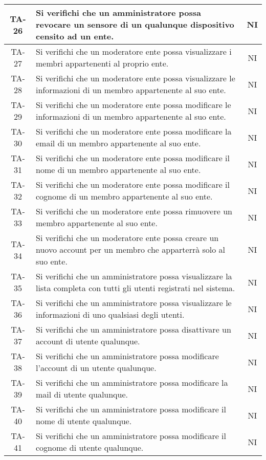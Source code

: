 \begin{center}
\begin{longtable}{|c|p{10cm}|c|}
			 \hline
			 TA-26 & Si verifichi che un amministratore possa revocare un sensore di un qualunque dispositivo censito ad un ente. & NI \\
			 \hline
			 TA-27 &  Si verifichi che un moderatore ente possa visualizzare i membri appartenenti al proprio ente. & NI \\
			 \hline
			 TA-28 & Si verifichi che un moderatore ente possa visualizzare le informazioni di un membro appartenente al suo ente. & NI \\
			 \hline
			 TA-29 & Si verifichi che un moderatore ente possa modificare le informazioni di un membro appartenente al suo ente. & NI \\
			 \hline
			 TA-30 & Si verifichi che un moderatore ente possa modificare la email di un membro appartenente al suo ente. & NI \\
			 \hline
			 TA-31 & Si verifichi che un moderatore ente possa modificare il nome di un membro appartenente al suo ente. & NI \\
			 \hline
			 TA-32 & Si verifichi che un moderatore ente possa modificare il cognome di un membro appartenente al suo ente. & NI \\
			 \hline
			 TA-33 & Si verifichi che un moderatore ente possa rimuovere un membro appartenente al suo ente. & NI \\
			 \hline
			 TA-34 & Si verifichi che un moderatore ente possa creare un nuovo account per un membro che apparterrà solo al suo ente. & NI \\
			 \hline
			 TA-35 & Si verifichi che un amministratore possa visualizzare la lista completa con tutti gli utenti registrati nel sistema. & NI \\
			 \hline
			 TA-36 & Si verifichi che un amministratore possa visualizzare le informazioni di uno qualsiasi degli utenti. & NI \\
			 \hline
			 TA-37 & Si verifichi che un amministratore possa disattivare un account di utente qualunque. & NI \\
			 \hline
			 TA-38 & Si verifichi che un amministratore possa modificare l'account di un utente qualunque. & NI \\
			 \hline
			 TA-39 & Si verifichi che un amministratore possa modificare la mail di utente qualunque. & NI \\
			 \hline
			 TA-40 & Si verifichi che un amministratore possa modificare il nome di utente qualunque. & NI \\
			 \hline
			 TA-41 & Si verifichi che un amministratore possa modificare il cognome di utente qualunque. & NI \\

\end{longtable}
\end{center}
